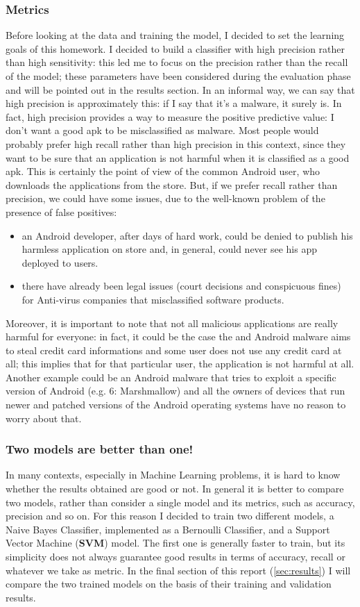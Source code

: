 \documentclass[12pt]{article}
\begin{document}
\subsubsection{Metrics}
Before looking at the data and training the model, I decided to set the learning goals of this homework. I decided to build a classifier with high precision rather than high sensitivity: this led me to focus on the precision rather than the recall of the model; these parameters have been considered during the evaluation phase and will be pointed out in the results section.
In an informal way, we can say that high precision is approximately this: if I say that it's a malware, it surely is. In fact, high precision provides a way to measure the positive predictive value: I don't want a good apk to be misclassified as malware.
Most people would probably prefer high recall rather than high precision in this context, since they want to be sure that an application is not harmful when it is classified as a good apk. This is certainly the point of view of the common Android user, who downloads the applications from the store. But, if we prefer recall rather than precision, we could have some issues, due to the well-known problem of the presence of false positives:
\begin{itemize}
\item an Android developer, after days of hard work, could be denied to publish his harmless application on store and, in general, could never see his app deployed to users.
\item there have already been legal issues (court decisions and conspicuous fines) for Anti-virus companies that misclassified software products.
\end{itemize}
Moreover, it is important to note that not all malicious applications are really harmful for everyone: in fact, it could be the case the and Android malware aims to steal credit card informations and some user does not use any credit card at all; this implies that for that particular user, the application is not harmful at all. Another example could be an Android malware that tries to exploit a specific version of Android (e.g. 6: Marshmallow) and all the owners of devices that run newer and patched versions of the Android operating systems have no reason to worry about that.
\subsubsection{Two models are better than one!}
\label{sec:models}
In many contexts, especially in Machine Learning problems, it is hard to know whether the results obtained are good or not. In general it is better to compare two models, rather than consider a single model and its metrics, such as accuracy, precision and so on.
For this reason I decided to train two different models, a Naive Bayes Classifier, implemented as a Bernoulli Classifier, and a Support Vector Machine (\textbf{SVM}) model. The first one is generally faster to train, but its simplicity does not always guarantee good results in terms of accuracy, recall or whatever we take as metric.
In the final section of this report (\ref{sec:results}) I will compare the two trained models on the basis of their training and validation results. 
\end{document}
